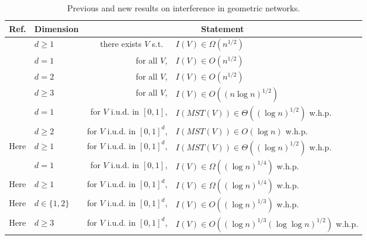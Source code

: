 \documentclass{patmorin}
\newcommand{\mst}{\mathit{MST}}
\begin{document}
\begin{table*}
\begin{center}
  \begin{tabular}{|l|l|r@{ }l|}\hline
    Ref. & Dimension & \multicolumn{2}{c|}{Statement} \\ \hline
    \cite{vR05} & $d\ge 1$ & there exists $V$ s.t.\ & $I(V)\in \Omega(n^{1/2})$ \\
    \cite{vR05} & $d=1$ & for all $V$, & $I(V)\in O(n^{1/2})$ \\
    \cite{ht08} & $d=2$ & for all $V$, & $I(V)\in O(n^{1/2})$ \\
    \cite{ht08} & $d\ge 3$ & for all $V$, & $I(V)\in O((n\log n)^{1/2})$ \\ \hline
    \cite{kkmns10} & $d= 1$ & for $V$ i.u.d. in $[0,1]$, & $I(\mst(V))\in \Theta((\log n)^{1/2})$ w.h.p. \\
    \cite{kdhk15} & $d\ge 2$ & for $V$ i.u.d. in $[0,1]^d$, & $I(\mst(V))\in O(\log n)$ w.h.p.  \\
    Here & $d\ge 1$ & for $V$ i.u.d. in $[0,1]^d$, & $I(\mst(V))\in \Theta((\log n)^{1/2})$ w.h.p.  \\ 
    \cite{kkmns10,vR05} & $d = 1$ & for $V$ i.u.d. in $[0,1]$, & $I(V)\in\Omega((\log n)^{1/4})$ w.h.p.  \\
    Here & $d\ge 1$ & for $V$ i.u.d. in $[0,1]^d$,  & $I(V)\in \Omega((\log n)^{1/4})$ w.h.p.  \\ 
    Here & $d\in\{1,2\}$ & for $V$ i.u.d. in $[0,1]^d$, & $I(V)\in O((\log n)^{1/3})$ w.h.p.  \\
    Here & $d\ge 3$ & for $V$ i.u.d. in $[0,1]^d$, & $I(V)\in O((\log n)^{1/3}(\log\log n)^{1/2})$ w.h.p.  \\
  \hline
  \end{tabular}
\end{center}
\caption{Previous and new results on interference in geometric networks.}
\end{table*}
\end{document}
